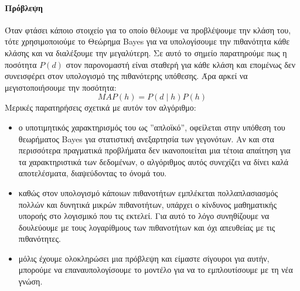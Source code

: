 \paragraph{Πρόβλεψη} Όταν φτάσει κάποιο στοιχείο για το οποίο θέλουμε να προβλέψουμε την κλάση του, τότε χρησιμοποιούμε το Θεώρημα Bayes για να υπολογίσουμε την πιθανότητα κάθε κλάσης και να διαλέξουμε την μεγαλύτερη. Σε αυτό το σημείο παρατηρούμε πως η ποσότητα $P(d)$ στον παρονομαστή είναι σταθερή
για κάθε κλάση και επομένως δεν συνεισφέρει στον υπολογισμό της πιθανότερης υπόθεσης. Άρα αρκεί να μεγιστοποιήσουμε την ποσότητα:
$$MAP(h)=P(d \mid h) P(h)$$
Μερικές παρατηρήσεις σχετικά με αυτόν τον αλγόριθμο:
\begin{itemize}
	\item ο υποτιμητικός χαρακτηρισμός του ως ”απλοϊκό”, οφείλεται στην υπόθεση του θεωρήματος Bayes για στατιστική ανεξαρτησία των γεγονότων. Αν και στα περισσότερα πραγματικά προβλήματα δεν ικανοποιείται μια τέτοια απαίτηση για τα χαρακτηριστικά των δεδομένων, ο αλγόριθμος αυτός συνεχίζει να δίνει καλά αποτελέσματα, διαψεύδοντας το όνομά του.
	\item καθώς στον υπολογισμό κάποιων πιθανοτήτων εμπλέκεται πολλαπλασιασμός πολλών και δυνητικά μικρών πιθανοτήτων, υπάρχει ο κίνδυνος μαθηματικής υποροής στο λογισμικό που τις εκτελεί. Για αυτό το λόγο συνηθίζουμε να δουλεύουμε με τους λογαρίθμους των πιθανοτήτων και όχι απευθείας με τις πιθανότητες.
	\item μόλις έχουμε ολοκληρώσει μια πρόβλεψη και είμαστε σίγουροι για αυτήν, μπορούμε να επαναυπολογίσουμε το μοντέλο για να το εμπλουτίσουμε με τη νέα γνώση.
\end{itemize}
